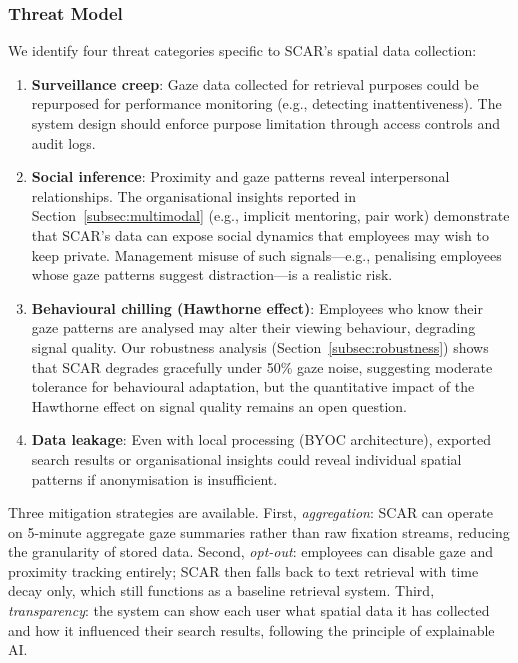 \documentclass[journal]{IEEEtran}
\begin{document}
\subsubsection{Threat Model}

We identify four threat categories specific to SCAR's spatial data collection:

\begin{enumerate}
\item \textbf{Surveillance creep}: Gaze data collected for retrieval purposes could be repurposed for performance monitoring (e.g., detecting inattentiveness). The system design should enforce purpose limitation through access controls and audit logs.
\item \textbf{Social inference}: Proximity and gaze patterns reveal interpersonal relationships. The organisational insights reported in Section~\ref{subsec:multimodal} (e.g., implicit mentoring, pair work) demonstrate that SCAR's data can expose social dynamics that employees may wish to keep private.  Management misuse of such signals---e.g., penalising employees whose gaze patterns suggest distraction---is a realistic risk.
\item \textbf{Behavioural chilling (Hawthorne effect)}: Employees who know their gaze patterns are analysed may alter their viewing behaviour, degrading signal quality. Our robustness analysis (Section~\ref{subsec:robustness}) shows that SCAR degrades gracefully under 50\% gaze noise, suggesting moderate tolerance for behavioural adaptation, but the quantitative impact of the Hawthorne effect on signal quality remains an open question.
\item \textbf{Data leakage}: Even with local processing (BYOC architecture), exported search results or organisational insights could reveal individual spatial patterns if anonymisation is insufficient.
\end{enumerate}

Three mitigation strategies are available. First, \emph{aggregation}: SCAR can operate on 5-minute aggregate gaze summaries rather than raw fixation streams, reducing the granularity of stored data. Second, \emph{opt-out}: employees can disable gaze and proximity tracking entirely; SCAR then falls back to text retrieval with time decay only, which still functions as a baseline retrieval system. Third, \emph{transparency}: the system can show each user what spatial data it has collected and how it influenced their search results, following the principle of explainable AI.
\end{document}
